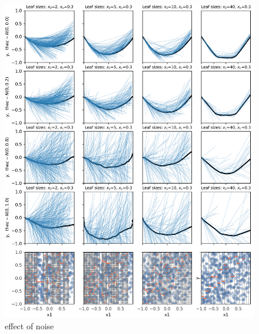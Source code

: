 \documentclass[12pt]{article}
\begin{document}
\begin{figure}[htbp]
\begin{center}
\includegraphics[scale=0.7]{images/meta_additivity_noise.png}
\caption{effect of noise}
\label{fig:meta_noise}
\end{center}
\end{figure}
\end{document}
